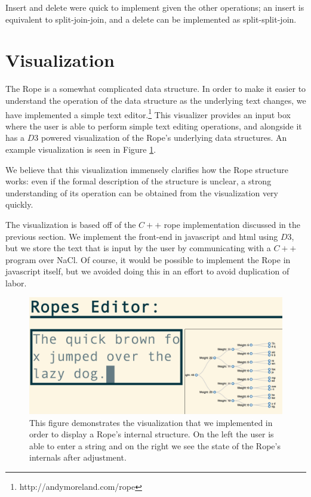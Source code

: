\documentclass[12pt]{article}
\begin{document}
Insert and delete were quick to implement given the other operations; an insert is equivalent to split-join-join, and a delete can be implemented as split-split-join.



\section{Visualization}

The Rope is a somewhat complicated data structure. In order to make it easier to understand the operation of the data structure as the underlying text changes, we have implemented a simple text editor.\footnote{http://andymoreland.com/rope} This visualizer provides an input box where the user is able to perform simple text editing operations, and alongside it has a $D3$ powered visualization of the Rope's underlying data structures. An example visualization is seen in Figure \ref{editor}.

We believe that this visualization immensely clarifies how the Rope structure works: even if the formal description of the structure is unclear, a strong understanding of its operation can be obtained from the visualization very quickly.

The visualization is based off of the $C++$ rope implementation discussed in the previous section. We implement the front-end in javascript and html using $D3$, but we store the text that is input by the user by communicating with a $C++$ program over NaCl. Of course, it would be possible to implement the Rope in javascript itself, but we avoided doing this in an effort to avoid duplication of labor.

\begin{figure}[t]
\begin{centering}
\includegraphics[scale=0.35]{editorImage1}
\caption{This figure demonstrates the visualization that we implemented in order to display a Rope's internal structure. On the left the user is able to enter a string and on the right we see the state of the Rope's internals after adjustment.}\label{editor}

\end{centering}
\end{figure}
\end{document}
